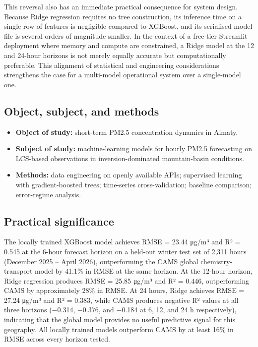 This reversal also has an immediate practical consequence for system design. Because Ridge regression requires no tree construction, its inference time on a single row of features is negligible compared to XGBoost, and its serialised model file is several orders of magnitude smaller. In the context of a free-tier Streamlit deployment where memory and compute are constrained, a Ridge model at the 12 and 24-hour horizons is not merely equally accurate but computationally preferable. This alignment of statistical and engineering considerations strengthens the case for a multi-model operational system over a single-model one.

\subsection{Object, subject, and methods}\label{object-subject-and-methods}

\begin{itemize}
\tightlist
\item
  \textbf{Object of study:} short-term PM2.5 concentration dynamics in Almaty.
\item
  \textbf{Subject of study:} machine-learning models for hourly PM2.5 forecasting on LCS-based observations in inversion-dominated mountain-basin conditions.
\item
  \textbf{Methods:} data engineering on openly available APIs; supervised learning with gradient-boosted trees; time-series cross-validation; baseline comparison; error-regime analysis.
\end{itemize}

\subsection{Practical significance}\label{practical-significance}

The locally trained XGBoost model achieves RMSE = 23.44 μg/m³ and R² = 0.545 at the 6-hour forecast horizon on a held-out winter test set of 2,311 hours (December 2025 -- April 2026), outperforming the CAMS global chemistry-transport model by 41.1\% in RMSE at the same horizon. At the 12-hour horizon, Ridge regression produces RMSE = 25.85 μg/m³ and R² = 0.446, outperforming CAMS by approximately 28\% in RMSE. At 24 hours, Ridge achieves RMSE = 27.24 μg/m³ and R² = 0.383, while CAMS produces negative R² values at all three horizons (−0.314, −0.376, and −0.184 at 6, 12, and 24 h respectively), indicating that the global model provides no useful predictive signal for this geography. All locally trained models outperform CAMS by at least 16\% in RMSE across every horizon tested.


